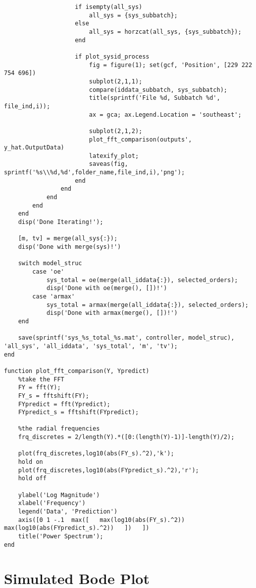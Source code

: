 \begin{lstlisting}
                    if isempty(all_sys)
                        all_sys = {sys_subbatch};
                    else
                        all_sys = horzcat(all_sys, {sys_subbatch});
                    end
    
                    if plot_sysid_process
                        fig = figure(1); set(gcf, 'Position', [229 222 754 696])
                        subplot(2,1,1);
                        compare(iddata_subbatch, sys_subbatch);
                        title(sprintf('File %d, Subbatch %d', file_ind,i));
                        ax = gca; ax.Legend.Location = 'southeast';
    
                        subplot(2,1,2);
                        plot_fft_comparison(outputs', y_hat.OutputData)
                        latexify_plot;
                        saveas(fig, sprintf('%s\\%d,%d',folder_name,file_ind,i),'png');
                    end
                end
            end
        end
    end
    disp('Done Iterating!');
    
    [m, tv] = merge(all_sys{:});
    disp('Done with merge(sys)!')
    
    switch model_struc
        case 'oe'
            sys_total = oe(merge(all_iddata{:}), selected_orders);
            disp('Done with oe(merge(), [])!')
        case 'armax'
            sys_total = armax(merge(all_iddata{:}), selected_orders);
            disp('Done with armax(merge(), [])!')
    end
    
    save(sprintf('sys_%s_total_%s.mat', controller, model_struc), 'all_sys', 'all_iddata', 'sys_total', 'm', 'tv');
end

function plot_fft_comparison(Y, Ypredict)
    %take the FFT
    FY = fft(Y);
    FY_s = fftshift(FY);
    FYpredict = fft(Ypredict);
    FYpredict_s = fftshift(FYpredict);
    
    %the radial frequencies
    frq_discretes = 2/length(Y).*([0:(length(Y)-1)]-length(Y)/2);
    
    plot(frq_discretes,log10(abs(FY_s).^2),'k');
    hold on
    plot(frq_discretes,log10(abs(FYpredict_s).^2),'r');
    hold off
    
    ylabel('Log Magnitude')
    xlabel('Frequency')
    legend('Data', 'Prediction')
    axis([0 1 -.1  max([   max(log10(abs(FY_s).^2))   max(log10(abs(FYpredict_s).^2))   ])   ])
    title('Power Spectrum');
end
\end{lstlisting}

\section{Simulated Bode Plot}

